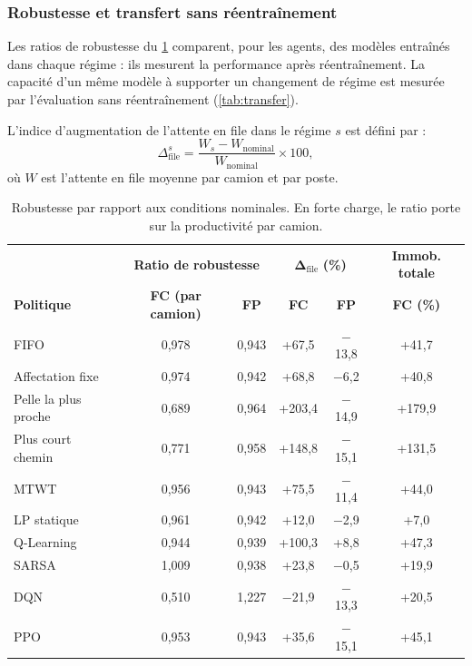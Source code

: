 \documentclass[11pt,a4paper]{article}
\newif\ifrevmarks
\newcommand{\revtag}[1]{\ifrevmarks\textsuperscript{\textcolor{red!70!black}{\scriptsize[#1]}}\fi}
\newenvironment{revbloc}[1]{\par\ifrevmarks\color{revcolor}\noindent\revtag{#1}\ \fi}{\par}
\newif\ifcorrmarks
\newcommand{\corr}[1]{\ifcorrmarks\textcolor{corrcolor}{#1}\else#1\fi}
\begin{document}
\subsubsection{Robustesse et transfert sans réentraînement}
\label{sec:robustness}

\begin{revbloc}{T31}
Les ratios de robustesse du \cref{tab:robustness} comparent, pour les agents, des modèles entraînés dans chaque régime : ils mesurent la performance après réentraînement. La capacité d'un même modèle à supporter un changement de régime est mesurée par l'évaluation sans réentraînement (\cref{tab:transfer}).

L'indice d'augmentation de l'attente en file dans le régime $s$ est défini par :
\begin{equation}
\Delta_{\mathrm{file}}^{s} = \frac{W_{s} - W_{\mathrm{nominal}}}{W_{\mathrm{nominal}}} \times 100 ,
\label{eq:delta_wait}
\end{equation}
où $W$ est l'attente en file moyenne par camion et par poste.

\begin{table}[H]
\centering
\caption{Robustesse par rapport aux conditions nominales. En forte charge, le ratio porte sur la productivité par camion.}
\label{tab:robustness}
\small
\setlength{\tabcolsep}{4pt}
\begin{tabular}{lcc|cc|c}
\toprule
 & \multicolumn{2}{c|}{\textbf{Ratio de robustesse}} & \multicolumn{2}{c|}{$\boldsymbol{\Delta_{\mathrm{file}}}$ \textbf{(\%)}} & \textbf{Immob. totale} \\
\textbf{Politique} & \textbf{FC (par camion)} & \textbf{FP} & \textbf{FC} & \textbf{FP} & \textbf{FC (\%)} \\
\midrule
FIFO                 & 0,978 & 0,943 & +67,5 & $-$13,8 & +41,7 \\
Affectation fixe     & 0,974 & 0,942 & +68,8 & $-$6,2 & +40,8 \\
Pelle la plus proche & 0,689 & 0,964 & +203,4 & $-$14,9 & +179,9 \\
Plus court chemin    & 0,771 & 0,958 & +148,8 & $-$15,1 & +131,5 \\
MTWT                 & 0,956 & 0,943 & +75,5 & $-$11,4 & +44,0 \\
\corr{LP statique}                   & 0,961 & 0,942 & +12,0 & $-$2,9 & +7,0 \\
\midrule
Q-Learning           & 0,944 & 0,939 & +100,3 & +8,8 & +47,3 \\
SARSA                & 1,009 & 0,938 & +23,8 & $-$0,5 & +19,9 \\
DQN                  & 0,510 & 1,227 & $-$21,9 & $-$13,3 & +20,5 \\
PPO                  & 0,953 & 0,943 & +35,6 & $-$15,1 & +45,1 \\
\bottomrule
\end{tabular}
\end{table}


\end{revbloc}
\end{document}
